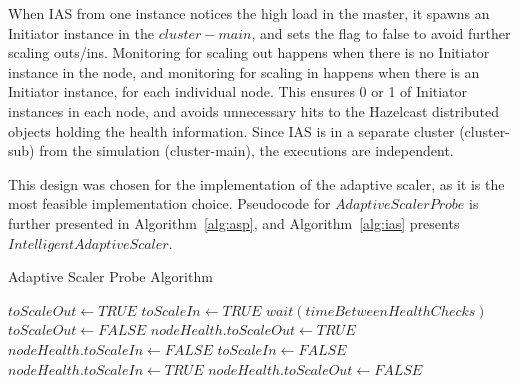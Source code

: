 When IAS from one instance notices the high load in the master, it spawns an Initiator instance in the $cluster-main$, and sets the flag to false to avoid further scaling outs/ins. Monitoring for scaling out happens when there is no Initiator instance in the node, and monitoring for scaling in happens when there is an Initiator instance, for each individual node. This ensures 0 or 1 of Initiator instances in each node, and avoids unnecessary hits to the Hazelcast distributed objects holding the health information. Since IAS is in a separate cluster (cluster-sub) from the simulation (cluster-main), the executions are independent. 

This design was chosen for the implementation of the adaptive scaler, as it is the most feasible implementation choice. Pseudocode for $AdaptiveScalerProbe$ is further presented in Algorithm~\ref{alg:asp}, and Algorithm~\ref{alg:ias} presents $IntelligentAdaptiveScaler$.
\begin{algorithm}[h]
  \caption{Adaptive Scaler Probe Algorithm}
\label{alg:asp}
  \begin{algorithmic}
\State $toScaleOut \gets TRUE$ 
\EndProcedure
\Statex
{}
\State $toScaleIn \gets TRUE$ 
\EndProcedure
\Statex
{}
\State $wait(timeBetweenHealthChecks)$
\State $toScaleOut \gets FALSE$
\State $nodeHealth.toScaleOut \gets TRUE$ 
\State $nodeHealth.toScaleIn \gets FALSE$
\State $toScaleIn \gets FALSE$
\State $nodeHealth.toScaleIn \gets TRUE$
\State $nodeHealth.toScaleOut \gets FALSE$
\EndIf
    \EndWhile  
\EndProcedure
  \end{algorithmic}
\end{algorithm}

